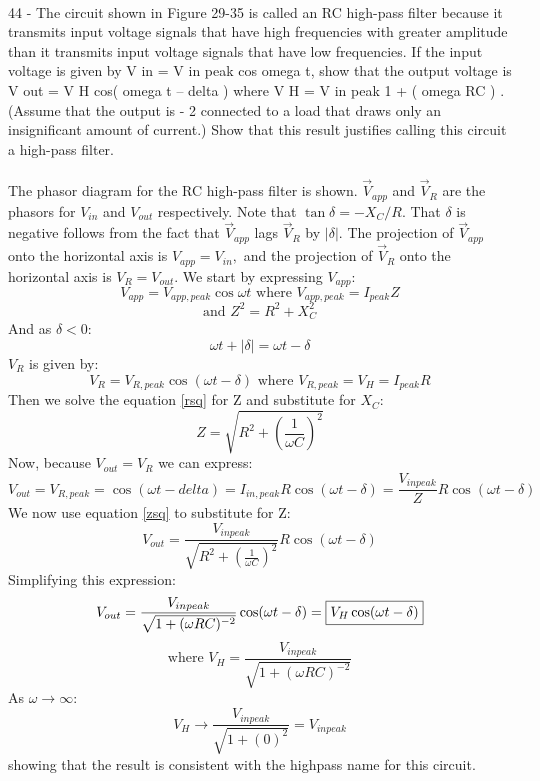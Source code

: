 \documentclass{report}
\begin{document}
\paragraph{}
44 - The circuit shown in Figure 29-35 is called an RC high-pass filter
because it transmits input voltage signals that have high frequencies with greater
amplitude than it transmits input voltage signals that have low frequencies. If the
input voltage is given by V in = V in peak cos omega t, show that the output voltage is
V out = V H cos( omega t – delta ) where V H = V in peak
1 + ( omega RC ) . (Assume that the output is - 2 connected to a load that draws only an insignificant amount of current.) Show that
this result justifies calling this circuit a high-pass filter.\\
\\
The phasor diagram for the RC high-pass filter is shown. $\vec V_{app}$ and $\vec V_R$ are the phasors for $V_{in}$ and $V_{out}$ respectively. Note that $\tan \delta = -X_C / R.$ That $\delta$ is negative follows from the fact that $\vec V_{app}$ lags $\vec V_R$ by $\lvert \delta \rvert$. The projection of $\vec V_{app}$ onto the horizontal axis is $V_{app} = V_{in},$ and the projection of $\vec V_R$ onto the horizontal axis is $V_R = V_{out}$. We start by expressing $V_{app}$:
$$V_{app} = V_{app,peak} \cos \omega t \text{ where } V_{app,peak} = I_{peak}Z$$
\begin{equation}\label{rsq}
\text{and } Z^2 = R^2 + X_C^2
\end{equation}
And as $\delta < 0$:
$$\omega t + \lvert \delta \rvert = \omega t - \delta$$
$V_R$ is given by:
$$V_R = V_{R,peak} \cos (\omega t - \delta) \text{ where } V_{R,peak} = V_H = I_{peak}R$$
Then we solve the equation \ref{rsq} for Z and substitute for $X_C$:
\begin{equation}\label{zsq}
  Z = \sqrt{R^2 + \left( \frac{1}{\omega C} \right)^2}
\end{equation}
Now, because $V_{out} = V_R$ we can express:
$$V_{out} = V_{R,peak} = \cos (\omega t - delta) = I_{in,peak}R\cos(\omega t - \delta) = \frac{V_{in peak}}{Z}R \cos (\omega t - \delta)$$
We now use equation \ref{zsq} to substitute for Z:
$$V_{out} = \frac{V_{in peak}}{\sqrt{R^2 + \left( \frac{1}{\omega C} \right)^2}}R \cos (\omega t - \delta)$$ 
Simplifying this expression:
$$V_{out} = \frac{V_{in peak}}{\sqrt{1 + (\omega RC)^{-2}}} \cos (\omega t - \delta) = \fbox{$V_H \cos (\omega t - \delta)$}$$
$$\text{where } V_H = \frac{V_{in peak}}{\sqrt{1+(\omega RC)^{-2}}}$$
As $\omega \rightarrow \infty$:
$$V_H \rightarrow \frac{V_{in peak}}{\sqrt{1+(0)^2}} = V_{in peak}$$
showing that the result is consistent with the highpass name for this circuit.
\end{document}
